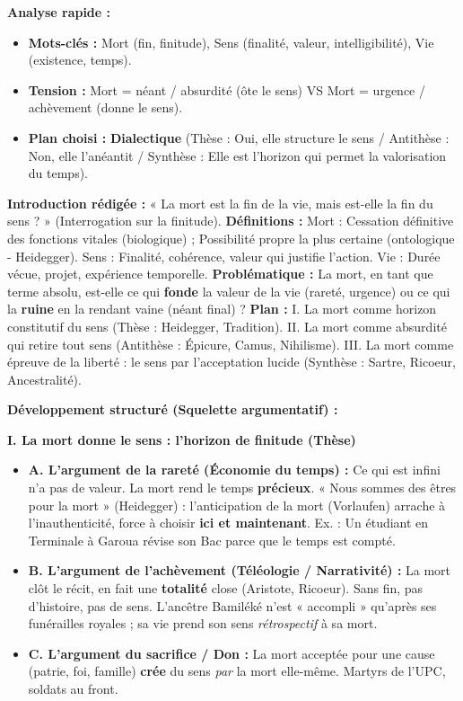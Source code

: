 \documentclass[11pt]{article}
\newcommand{\cle}[1]{{\popxbold\color{popdark}#1}}
\begin{document}
\begin{exoresolu}
\textbf{Analyse rapide :}
\begin{itemize}
    \item \textbf{Mots-clés :} Mort (fin, finitude), Sens (finalité, valeur, intelligibilité), Vie (existence, temps).
    \item \textbf{Tension :} Mort = néant / absurdité (ôte le sens) VS Mort = urgence / achèvement (donne le sens).
    \item \textbf{Plan choisi :} \textbf{Dialectique} (Thèse : Oui, elle structure le sens / Antithèse : Non, elle l'anéantit / Synthèse : Elle est l'horizon qui permet la valorisation du temps).
\end{itemize}

\tcblower

\textbf{Introduction rédigée :}
« La mort est la fin de la vie, mais est-elle la fin du sens ? » (Interrogation sur la finitude).
\textbf{Définitions :} \cle{Mort} : Cessation définitive des fonctions vitales (biologique) ; Possibilité propre la plus certaine (ontologique - Heidegger). \cle{Sens} : Finalité, cohérence, valeur qui justifie l'action. \cle{Vie} : Durée vécue, projet, expérience temporelle.
\textbf{Problématique :} La mort, en tant que terme absolu, est-elle ce qui \textbf{fonde} la valeur de la vie (rareté, urgence) ou ce qui la \textbf{ruine} en la rendant vaine (néant final) ?
\textbf{Plan :} I. La mort comme horizon constitutif du sens (Thèse : Heidegger, Tradition). II. La mort comme absurdité qui retire tout sens (Antithèse : Épicure, Camus, Nihilisme). III. La mort comme épreuve de la liberté : le sens par l'acceptation lucide (Synthèse : Sartre, Ricoeur, Ancestralité).

\textbf{Développement structuré (Squelette argumentatif) :}

\textbf{I. La mort donne le sens : l'horizon de finitude (Thèse)}
\begin{itemize}
    \item \textbf{A. L'argument de la rareté (Économie du temps) :} Ce qui est infini n'a pas de valeur. La mort rend le temps \textbf{précieux}. « Nous sommes des êtres pour la mort » (Heidegger) : l'anticipation de la mort (Vorlaufen) arrache à l'inauthenticité, force à choisir \textbf{ici et maintenant}. Ex. : Un étudiant en Terminale à Garoua révise son Bac parce que le temps est compté.
    \item \textbf{B. L'argument de l'achèvement (Téléologie / Narrativité) :} La mort clôt le récit, en fait une \textbf{totalité} close (Aristote, Ricoeur). Sans fin, pas d'histoire, pas de sens. L'ancêtre Bamiléké n'est « accompli » qu'après ses funérailles royales ; sa vie prend son sens \emph{rétrospectif} à sa mort.
    \item \textbf{C. L'argument du sacrifice / Don :} La mort acceptée pour une cause (patrie, foi, famille) \textbf{crée} du sens \emph{par} la mort elle-même. Martyrs de l'UPC, soldats au front.
\end{itemize}


\end{exoresolu}
\end{document}
